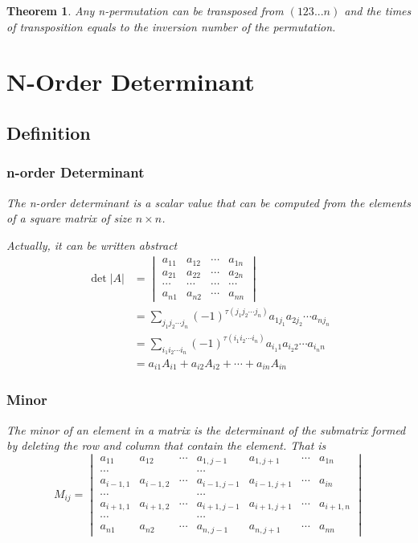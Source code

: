 \documentclass{article}
\newtheorem{theorem}{Theorem}[section]
\theoremstyle{definition}
\begin{document}
\begin{theorem}
Any n-permutation can be transposed from $(123...n)$ and the times 
of transposition equals to the inversion number of the permutation.

\section{N-Order Determinant}
\subsection{Definition}
\subsubsection{n-order Determinant}
The n-order determinant is a scalar value that can be computed from 
the elements of a square matrix of size $n\times n$.

Actually, it can be written abstract
\begin{align*}
\det |A|  
& =
\begin{vmatrix}
    a_{11} & a_{12} & \cdots & a_{1n}\\
    a_{21} & a_{22} & \cdots & a_{2n}\\
    \cdots & \cdots & \cdots & \cdots\\
    a_{n1} & a_{n2} & \cdots & a_{nn}
\end{vmatrix} \\
& = \sum_{j_{1}j_{2}\cdots j_{n}}(-1)^{\tau (j_{1}j_{2}\cdots j_{n})} a_{1j_{1}}a_{2j_{2}}\cdots a_{nj_{n}} \\
& = \sum_{i_{1}i_{2}\cdots i_{n}}(-1)^{\tau (i_{1}i_{2}\cdots i_{n})} a_{i_{1}1}a_{i_{2}2}\cdots a_{i_{n}n} \\
& = a_{i1}A_{i1}+a_{i2}A_{i2}+\cdots+a_{in}A_{in}
\end{align*}

\subsubsection{Minor}
The minor of an element in a matrix is the determinant 
of the submatrix formed by deleting the 
row and column that contain the element.
That is 
$$M_{ij}=
\begin{vmatrix}
    a_{11} & a_{12} & \cdots & a_{1,j-1} & a_{1,j+1} & \cdots & a_{1n}\\
    \cdots &  &  & \cdots\\
    a_{i-1,1} & a_{i-1,2} & \cdots & a_{i-1,j-1} & a_{i-1,j+1} & \cdots & a_{in}\\
    \cdots &  &  & \cdots\\
    a_{i+1,1} & a_{i+1,2} & \cdots & a_{i+1,j-1} & a_{i+1,j+1} & \cdots & a_{i+1,n}\\
    \cdots &  &  & \cdots\\
    a_{n1} & a_{n2} & \cdots & a_{n,j-1} & a_{n,j+1} & \cdots & a_{nn}
\end{vmatrix}$$



\end{theorem}
\end{document}
